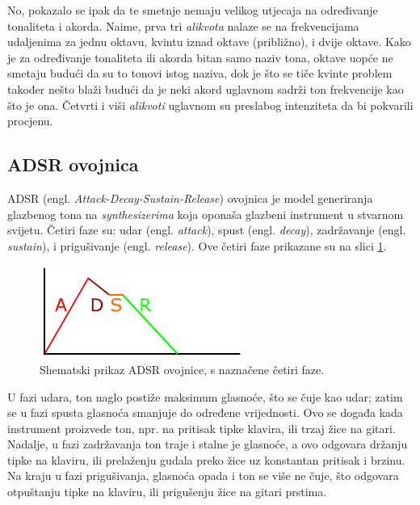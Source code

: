 \documentclass[a4paper, 11pt, twocolumn]{article}
\begin{document}
No, pokazalo se ipak da te smetnje nemaju velikog utjecaja na određivanje tonaliteta i akorda.
Naime, prva tri \textit{alikvota} nalaze se na frekvencijama udaljenima za jednu oktavu, kvintu iznad oktave (približno), i dvije oktave.
Kako je za određivanje tonaliteta ili akorda bitan samo naziv tona, oktave uopće ne smetaju budući da su to tonovi istog naziva, dok je što se tiče kvinte problem također nešto blaži budući da je neki akord uglavnom sadrži ton frekvencije kao što je ona.
Četvrti i viši \textit{alikvoti} uglavnom su preslabog intenziteta da bi pokvarili procjenu.

\subsection{ADSR ovojnica}
\label{ss:adsr}
ADSR (engl. \textit{Attack-Decay-Sustain-Release}) ovojnica je model generiranja glazbenog tona na \textit{synthesizerima} koja oponaša glazbeni instrument u stvarnom svijetu.
Četiri faze su: udar (engl. \textit{attack}), spust (engl. \textit{decay}), zadržavanje (engl. \textit{sustain}), i prigušivanje (engl. \textit{release}).
Ove četiri faze prikazane su na slici \ref{fig:adsr}.

\begin{figure}[htb]
  \includegraphics[width=\linewidth]{Adsr3}
  \caption{Shematski prikaz ADSR ovojnice, s naznačene četiri faze.}
  \label{fig:adsr}
\end{figure}

U fazi udara, ton naglo postiže maksimum glasnoće, što se čuje kao udar;
zatim se u fazi spusta glasnoća smanjuje do određene vrijednosti.
Ovo se događa kada instrument proizvede ton, npr. na pritisak tipke klavira, ili trzaj žice na gitari.
Nadalje, u fazi zadržavanja ton traje i stalne je glasnoće, a ovo odgovara držanju tipke na klaviru, ili prelaženju gudala preko žice uz konstantan pritisak i brzinu.
Na kraju u fazi prigušivanja, glasnoća opada i ton se više ne čuje, što odgovara otpuštanju tipke na klaviru, ili prigušenju žice na gitari prstima.
\end{document}
